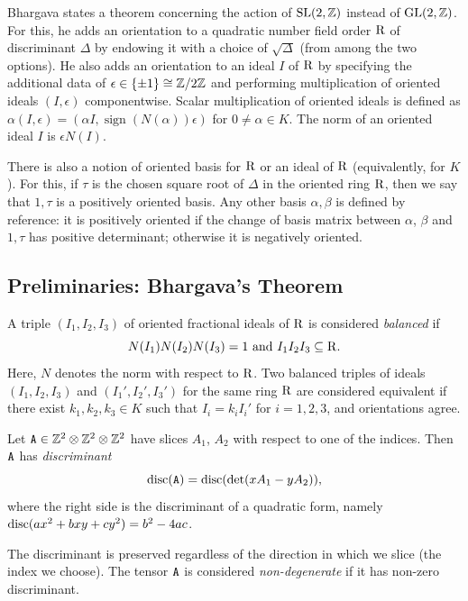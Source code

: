 Bhargava states a theorem concerning the action of $\mathrm{SL}(2,\mathbb{Z})$ instead of $\mathrm{GL}(2,\mathbb{Z})$.  For this, he adds an orientation to a quadratic number field order $\mathrm{R}$ of discriminant $\Delta$ by endowing it with a choice of $\sqrt{\Delta}$ (from among the two options).  He also adds an orientation to an ideal $I$ of $\mathrm{R}$ by specifying the additional data of $\epsilon \in \{ \pm 1 \} \cong \mathbb{Z}/2\mathbb{Z}$ and performing multiplication of oriented ideals $(I,\epsilon)$ componentwise.  Scalar multiplication of oriented ideals is defined as $\alpha (I, \epsilon) = (\alpha I, \operatorname{sign}(N(\alpha))\epsilon)$ for $0 \neq \alpha \in K$.  The norm of an oriented ideal $I$ is $\epsilon N(I)$.

There is also a notion of oriented basis for $\mathrm{R}$ or an ideal of $\mathrm{R}$ (equivalently, for $K$).  For this, if $\tau$ is the chosen square root of $\Delta$ in the oriented ring $\mathrm{R}$, then we say that $1, \tau$ is a positively oriented basis.  Any other basis $\alpha, \beta$ is defined by reference:  it is positively oriented if the change of basis matrix between $\alpha$, $\beta$ and $1, \tau$ has positive determinant; otherwise it is negatively oriented.


\subsection{Preliminaries: Bhargava's Theorem}

\begin{definition}
A triple $(I_1, I_2, I_3)$ of oriented fractional ideals of $\mathrm{R}$ is considered \emph{balanced} if $$N(I_1)N(I_2)N(I_3) = 1 \text{ and } I_1I_2I_3 \subseteq \mathrm{R}.$$  
Here, $N$ denotes the norm with respect to $\mathrm{R}$.  Two balanced triples of ideals $(I_1, I_2, I_3)$ and $(I_1', I_2', I_3')$ for the same ring $\mathrm{R}$ are considered equivalent if there exist $k_1, k_2, k_3 \in K$ such that $I_i = k_i I_i'$ for $i=1,2,3$, and orientations agree.
\end{definition}

\begin{definition}  Let $\mathtt{A} \in \mathbb{Z}^2 \otimes \mathbb{Z}^2 \otimes \mathbb{Z}^2$ have slices $A_1$, $A_2$ with respect to one of the indices.  Then $\mathtt{A}$ has \emph{discriminant} 
\[
\operatorname{disc}(\mathtt{A}) = \operatorname{disc}(\det( xA_1 - yA_2)),
\]
where the right side is the discriminant of a quadratic form, namely $\operatorname{disc}(ax^2 + bxy + cy^2) = b^2 - 4ac$.
\end{definition}
The discriminant is preserved regardless of the direction in which we slice (the index we choose).  The tensor $\mathtt{A}$ is considered \emph{non-degenerate} if it has non-zero discriminant.

